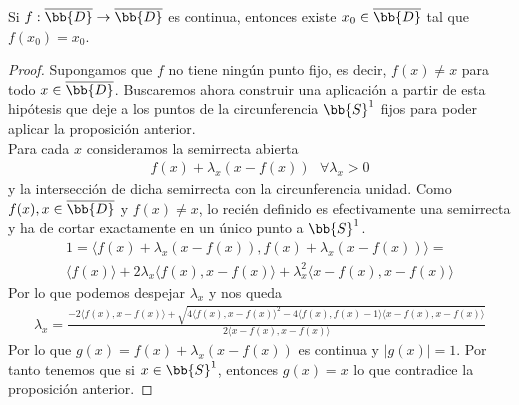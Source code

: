 \begin{teo}
    Si $f:\overline{\bb{D}} \to \overline{\bb{D}}$ es continua, entonces existe $x_0\in \overline{\bb{D}}$ tal que $f(x_0)=x_0$.

    \begin{proof}
        Supongamos que $f$ no tiene ningún punto fijo, es decir, $f(x)\neq x$ para todo $x\in \overline{\bb{D}}$. Buscaremos ahora construir una aplicación a partir de esta hipótesis que deje a los puntos de la circunferencia $\bb{S}^1$ fijos para poder aplicar la proposición anterior. \\

        Para cada $x$ consideramos la semirrecta abierta 
        \begin{gather*}
            f(x) + \lambda_x (x-f(x))\ \ \ \forall \lambda_x >0
        \end{gather*}
        y la intersección de dicha semirrecta con la circunferencia unidad. Como $f(x),x\in \overline{\bb{D}}$ y $f(x)\neq x$, lo recién definido es efectivamente una semirrecta y ha de cortar exactamente en un único punto a $\bb{S}^1$.
        \begin{gather*}
            1 = \langle f(x) + \lambda_x (x-f(x)), f(x) + \lambda_x (x-f(x)) \rangle =\\
            \langle f(x) \rangle + 2\lambda_x \langle f(x), x-f(x)\rangle + \lambda_x^2 \langle x-f(x), x-f(x) \rangle
        \end{gather*}
        Por lo que podemos despejar $\lambda_x$ y nos queda
        \begin{gather*}
            \lambda_x = \frac{-2\langle f(x), x-f(x) \rangle + \sqrt{4\langle f(x), x-f(x)\rangle^2 - 4\langle f(x),f(x)-1\rangle\langle x-f(x), x-f(x)\rangle}}{2\langle x-f(x), x-f(x) \rangle}
        \end{gather*}
        Por lo que $g(x) = f(x) + \lambda_x(x-f(x))$ es continua y $|g(x)|=1$. Por tanto tenemos que si $x\in \bb{S}^1$, entonces $g(x)=x$ lo que contradice la proposición anterior.
    \end{proof}
\end{teo}


